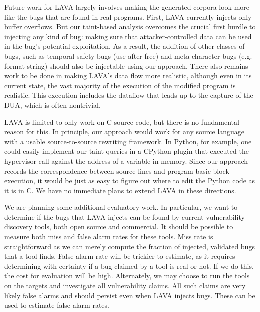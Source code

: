 Future work for LAVA largely involves making the generated corpora look more like the bugs that are found in real programs. 
First, LAVA currently injects only buffer overflows. 
But our taint-based analysis overcomes the crucial first hurdle to injecting any kind of bug: making sure that attacker-controlled data can be used in the bug's potential exploitation. 
As a result, the addition of other classes of bugs, such as temporal safety bugs (use-after-free) and meta-character bugs (e.g. format string) should also be injectable using our approach. 
There also remains work to be done in making LAVA's data flow more realistic, although even in its current state, the vast majority of the execution of the modified program is realistic. 
This execution includes the dataflow that leads up to the capture of the DUA, which is often nontrivial.

LAVA is limited to only work on C source code, but there is no fundamental reason for this.
In principle, our approach would work for any source language with a usable source-to-source rewriting framework. 
In Python, for example, one could easily implement our taint queries in a CPython plugin that executed the hypervisor call against the address of a variable in memory. 
Since our approach records the correspondence between source lines and program basic block execution, it would be just as easy to figure out where to edit the Python code as it is in C.
We have no immediate plans to extend LAVA in these directions.

We are planning some additional evaluatory work.
In particular, we want to determine if the bugs that LAVA injects can be found by current vulnerability discovery tools, both open source and commercial.
It should be possible to measure both miss and false alarm rates for these tools. 
Miss rate is straightforward as we can merely compute the fraction of injected, validated bugs that a tool finds.
False alarm rate will be trickier to estimate, as it requires determining with certainty if a bug claimed by a tool is real or not. 
If we do this, the cost for evaluation will be high.
Alternately, we may choose to run the tools on the targets and investigate all vulnerability claims.
All such claims are very likely false alarms and should persist even when LAVA injects bugs.  
These can be used to estimate false alarm rates.  

